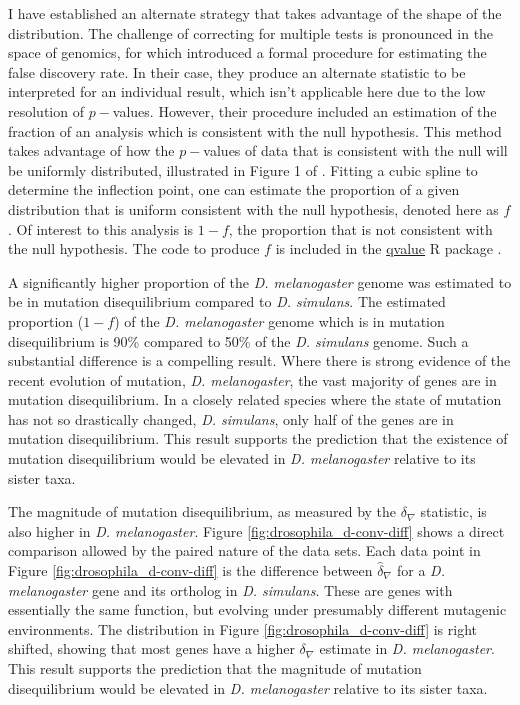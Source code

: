 I have established an alternate strategy that takes advantage of the shape of the distribution. The challenge of correcting for multiple tests is pronounced in the space of genomics, for which \cite{Storey2003StatisticalStudies} introduced a formal procedure for estimating the false discovery rate. In their case, they produce an alternate statistic to be interpreted for an individual result, which isn't applicable here due to the low resolution of $p-$values. However, their procedure included an estimation of the fraction of an analysis which is consistent with the null hypothesis. This method takes advantage of how the $p-$values of data that is consistent with the null will be uniformly distributed, illustrated in Figure 1 of \citep{Storey2003StatisticalStudies}. Fitting a cubic spline to determine the inflection point, one can estimate the proportion of a given distribution that is uniform consistent with the null hypothesis, denoted here as $f$. Of interest to this analysis is $1 - f$, the proportion that is not consistent with the null hypothesis. The code to produce $f$ is included in the \href{https://github.com/StoreyLab/qvalue}{qvalue} R package \citep{Storey2004StrongApproach}.  

A significantly higher proportion of the \textit{D. melanogaster} genome was estimated to be in mutation disequilibrium compared to \textit{D. simulans}. The estimated proportion ($1 - f$) of the \textit{D. melanogaster} genome which is in mutation disequilibrium is 90\% compared to 50\% of the \textit{D. simulans} genome. Such a substantial difference is a compelling result. Where there is strong evidence of the recent evolution of mutation, \textit{D. melanogaster}, the vast majority of genes are in mutation disequilibrium. In a closely related species where the state of mutation has not so drastically changed, \textit{D. simulans}, only half of the genes are in mutation disequilibrium. This result supports the prediction that the existence of mutation disequilibrium would be elevated in \textit{D. melanogaster} relative to its sister taxa.

The magnitude of mutation disequilibrium, as measured by the $\delta_\nabla$  statistic, is also higher in \textit{D. melanogaster}. Figure \ref{fig:drosophila_d-conv-diff} shows a direct comparison allowed by the paired nature of the data sets. Each data point in Figure \ref{fig:drosophila_d-conv-diff} is the difference between $\hat \delta_\nabla$ for a \textit{D. melanogaster} gene and its ortholog in \textit{D. simulans}. These are genes with essentially the same function, but evolving under presumably different mutagenic environments. The distribution in Figure \ref{fig:drosophila_d-conv-diff} is right shifted, showing that most genes have a higher $\delta_\nabla$ estimate in \textit{D. melanogaster}. This result supports the prediction that the magnitude of mutation disequilibrium would be elevated in \textit{D. melanogaster} relative to its sister taxa. 

